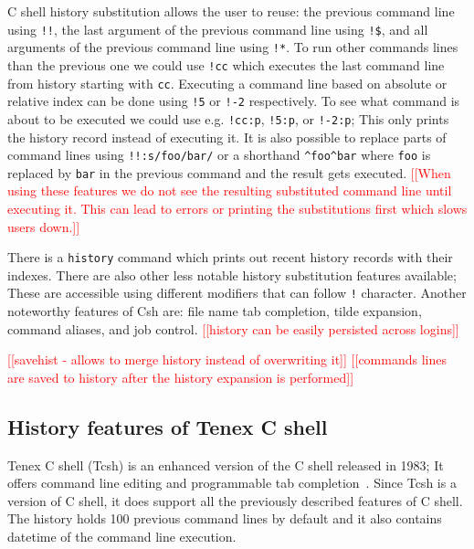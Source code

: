\documentclass[thesis=M,english]{FITthesis}[2012/10/20]
\newcommand{\redtext}[1]{\textcolor{red}{[[#1]]}}
\let\myCite\cite
\renewcommand\cite{\unskip~\myCite}
\begin{document}
C shell history substitution allows the user to reuse: the previous command line using \verb|!!|, the last argument of the previous command line using \verb|!$|, and all arguments of the previous command line using \verb|!*|. To run other commands lines than the previous one we could use \verb|!cc| which executes the last command line from history starting with \verb|cc|. Executing a command line based on absolute or relative index can be done using \verb|!5| or \verb|!-2| respectively. To see what command is about to be executed we could use e.g. \verb|!cc:p|, \verb|!5:p|, or \verb|!-2:p|; This only prints the history record instead of executing it. It is also possible to replace parts of command lines using \verb|!!:s/foo/bar/| or a shorthand \verb|^foo^bar| where \verb|foo| is replaced by \verb|bar| in the previous command and the result gets executed. \redtext{When using these features we do not see the resulting substituted command line until executing it. This can lead to errors or printing the substitutions first which slows users down.}
    
There is a \verb|history| command which prints out recent history records with their indexes. There are also other less notable history substitution features available; These are accessible using different modifiers that can follow \verb|!| character. Another noteworthy features of Csh are: file name tab completion, tilde expansion, command aliases, and job control. \redtext{history can be easily persisted across logins}

\redtext{savehist - allows to merge history instead of overwriting it}
\redtext{commands lines are saved to history after the history expansion is performed}


\subsection{History features of Tenex C shell}
Tenex C shell (Tcsh) is an enhanced version of the C shell released in 1983; It offers command line editing and programmable tab completion\cite{dubois1995tcshusing}. Since Tcsh is a version of C shell, it does support all the previously described features of C shell. The history holds 100 previous command lines by default and it also contains datetime of the command line execution.
\end{document}
